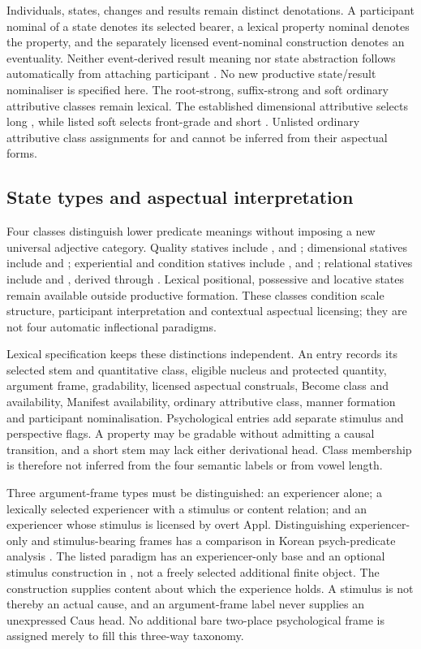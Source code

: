 Individuals, states, changes and results remain distinct denotations. A
participant nominal of a state denotes its selected bearer, a lexical property
nominal denotes the property, and the separately licensed event-nominal
construction denotes an eventuality. Neither event-derived result meaning
nor state abstraction follows automatically from attaching participant
. No new productive state/result nominaliser is specified here.
The root-strong, suffix-strong and soft ordinary attributive classes remain
lexical. The established dimensional attributive  selects
long , while listed soft  selects front-grade
 and short . Unlisted ordinary attributive class
assignments for  and  cannot be inferred
from their aspectual forms.

\subsection{State types and aspectual interpretation}\label{sec:stative-stability}

Four classes distinguish lower predicate meanings without imposing a new
universal adjective category. Quality statives include ,
 and ; dimensional statives include
 and ; experiential and condition statives include
,  and ; relational statives include
 and , derived through .
Lexical positional, possessive and locative states remain available outside
productive  formation. These classes condition scale structure,
participant interpretation and contextual aspectual licensing; they are not
four automatic inflectional paradigms.


Lexical specification keeps these distinctions independent. An entry records
its selected stem and quantitative class, eligible nucleus and protected
quantity, argument frame, gradability, licensed aspectual construals,
Become class and availability, Manifest availability, ordinary attributive
class, manner formation and participant nominalisation. Psychological entries
add separate stimulus and perspective flags. A property may be gradable
without admitting a causal transition, and a short stem may lack either
derivational head. Class membership is therefore not inferred from the four
semantic labels or from vowel length.

Three argument-frame types must be distinguished: an experiencer alone;
a lexically selected experiencer with a stimulus or content relation; and an
experiencer whose stimulus is licensed by overt Appl. Distinguishing
experiencer-only and stimulus-bearing frames has a comparison in Korean
psych-predicate analysis \cite{kimyoonshin2026}. The listed
 paradigm has an experiencer-only base and an optional stimulus
construction in , not a freely selected additional finite object.
The construction supplies content about which the experience holds. A stimulus
is not thereby an actual cause, and an argument-frame label never supplies
an unexpressed Caus head. No additional bare two-place psychological frame is
assigned merely to fill this three-way taxonomy.

